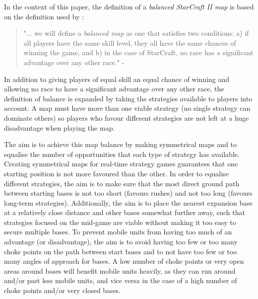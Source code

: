 In the context of this paper, the definition of a \textit{balanced StarCraft II map} is based on the definition used by \citeauthor{uriarte2013psmage}\cite{uriarte2013psmage}:
\begin{quote}
	"... we will define a \textit{balanced map} as one that satisfies two conditions: a) if all players have the same skill level, they all have the same chances of winning the game, and b) in the case of StarCraft, no race has a significant advantage over any other race." - \citeauthor{uriarte2013psmage}\cite{uriarte2013psmage}
\end{quote}

In addition to giving players of equal skill an equal chance of winning and allowing no race to have a significant advantage over any other race, the definition of balance is expanded by taking the strategies available to players into account. A map must have more than one viable strategy (no single strategy can dominate others) so players who favour different strategies are not left at a huge disadvantage when playing the map. 

The aim is to achieve this map balance by making symmetrical maps and to equalise the number of opportunities that each type of strategy has available. Creating symmetrical maps for real-time strategy games guarantees that one starting position is not more favoured than the other. In order to equalise different strategies, the aim is to make sure that the most direct ground path between starting bases is not too short (favours rushes) and not too long (favours long-term strategies). Additionally, the aim is to place the nearest expansion base at a relatively close distance and other bases somewhat further away, such that strategies focused on the mid-game are viable without making it too easy to secure multiple bases. To prevent mobile units from having too much of an advantage (or disadvantage), the aim is to avoid having too few or too many choke points on the path between start bases and to not have too few or too many angles of approach for bases. A low number of choke points or very open areas around bases will benefit mobile units heavily, as they can run around and/or past less mobile units, and vice versa in the case of a high number of choke points and/or very closed bases.

